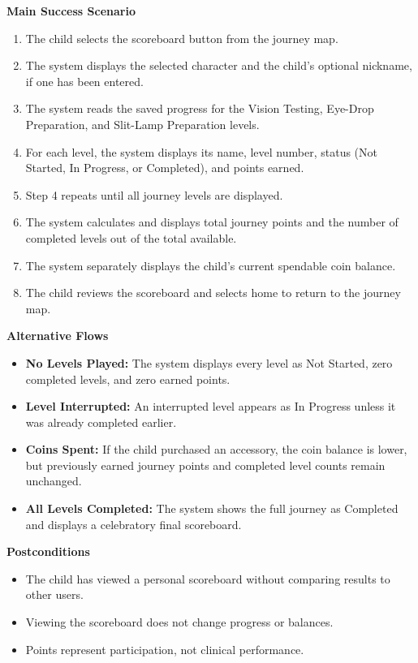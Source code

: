 \documentclass[12pt]{article}
\begin{document}
\textbf{Main Success Scenario}
\begin{enumerate}
    \item The child selects the scoreboard button from the journey map.
    \item The system displays the selected character and the
    child's optional nickname, if one has been entered.
    \item The system reads the saved progress for the Vision Testing,
    Eye-Drop Preparation, and Slit-Lamp Preparation levels.
    \item For each level, the system displays its name, level number,
    status (Not Started, In Progress, or Completed), and points earned.
    \item Step 4 repeats until all journey levels are displayed.
    \item The system calculates and displays total journey points
    and the number of completed levels out of the total available.
    \item The system separately displays the child's current
    spendable coin balance.
    \item The child reviews the scoreboard and selects home to
    return to the journey map.
\end{enumerate}

\textbf{Alternative Flows}
\begin{itemize}
    \item \textbf{No Levels Played:} The system displays every level
    as Not Started, zero completed levels, and zero earned points.
    \item \textbf{Level Interrupted:} An interrupted level appears as
    In Progress unless it was already completed earlier.
    \item \textbf{Coins Spent:} If the child purchased an accessory,
    the coin balance is lower, but previously earned journey points
    and completed level counts remain unchanged.
    \item \textbf{All Levels Completed:} The system shows the full
    journey as Completed and displays a celebratory final scoreboard.
\end{itemize}

\textbf{Postconditions}
\begin{itemize}
    \item The child has viewed a personal scoreboard without
    comparing results to other users.
    \item Viewing the scoreboard does not change progress or balances.
    \item Points represent participation, not clinical performance.
\end{itemize}
\end{document}
